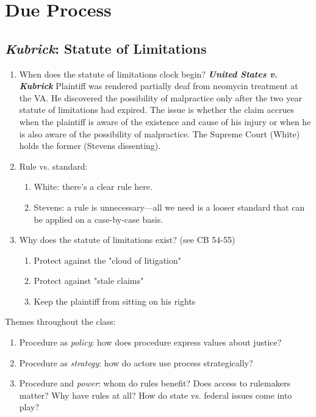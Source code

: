 \section{Due Process}

\subsection{\emph{Kubrick}: Statute of Limitations}

\begin{enumerate}
    \item When does the statute of limitations clock begin? \textbf{\emph{United States v. Kubrick}} Plaintiff was rendered partially deaf from neomycin treatment at the VA. He discovered the possibility of malpractice only after the two year statute of limitations had expired. The issue is whether the claim accrues when the plaintiff is aware of the existence and cause of his injury or when he is also aware of the possibility of malpractice. The Supreme Court (White) holds the former (Stevens dissenting).
    \item Rule vs. standard:
    \begin{enumerate}
        \item White: there's a clear rule here.
        \item Stevens: a rule is unnecessary---all we need is a looser standard that can be applied on a case-by-case basis.
    \end{enumerate}
    \item Why does the statute of limitations exist? (see CB 54-55)
    \begin{enumerate}
        \item Protect against the "cloud of litigation"
        \item Protect against "stale claims"
        \item Keep the plaintiff from sitting on his rights
    \end{enumerate}
\end{enumerate}

Themes throughout the class:

\begin{enumerate}
    \item Procedure as \emph{policy}: how does procedure express values about justice?
    \item Procedure as \emph{strategy}: how do actors use process strategically?
    \item Procedure and \emph{power}: whom do rules benefit? Does access to rulemakers matter? Why have rules at all? How do state vs. federal issues come into play?
\end{enumerate}

